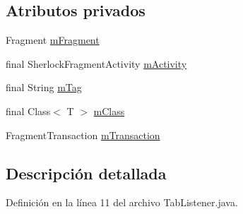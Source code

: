 \subsection*{Atributos privados}
\begin{DoxyCompactItemize}
\item 
Fragment \hyperlink{classes_1_1ucm_1_1tfg_1_1controlremotolinux_1_1client_1_1controller_1_1TabListener_3_01T_01extends_01ListFragment_01_4_ab05b14169573fa4109202a17a9f48507}{m\-Fragment}
\item 
final Sherlock\-Fragment\-Activity \hyperlink{classes_1_1ucm_1_1tfg_1_1controlremotolinux_1_1client_1_1controller_1_1TabListener_3_01T_01extends_01ListFragment_01_4_a736cc9d17d8f0b1a7b11d8fe086af84d}{m\-Activity}
\item 
final String \hyperlink{classes_1_1ucm_1_1tfg_1_1controlremotolinux_1_1client_1_1controller_1_1TabListener_3_01T_01extends_01ListFragment_01_4_a10f044e273c8c5f4910d8eca4b8f9728}{m\-Tag}
\item 
final Class$<$ T $>$ \hyperlink{classes_1_1ucm_1_1tfg_1_1controlremotolinux_1_1client_1_1controller_1_1TabListener_3_01T_01extends_01ListFragment_01_4_af8ec988af20112a3f63f77113323c152}{m\-Class}
\item 
Fragment\-Transaction \hyperlink{classes_1_1ucm_1_1tfg_1_1controlremotolinux_1_1client_1_1controller_1_1TabListener_3_01T_01extends_01ListFragment_01_4_a155f87ca0c2004ce5fcbdc094adc0c05}{m\-Transaction}
\end{DoxyCompactItemize}


\subsection{Descripción detallada}


Definición en la línea 11 del archivo Tab\-Listener.\-java.



